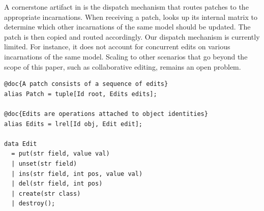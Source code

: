 A cornerstone artifact in \prism is the dispatch mechanism that routes patches to the appropriate incarnations.
When receiving a patch, \prism looks up its internal matrix to determine which other incarnations of the same model should be updated.
The patch is then copied and routed accordingly.
Our dispatch mechanism is currently limited.
For instance, it does not account for concurrent edits on various incarnations of the same model.
Scaling \prism to other scenarios that go beyond the scope of this paper, such as collaborative editing, remains an open problem.


\begin{lstlisting}[label=lst:delta-adt, caption={CRUD-like patch definition in Rascal.}, language=Rascal, float=tb]
@doc{A patch consists of a sequence of edits}
alias Patch = tuple[Id root, Edits edits];

@doc{Edits are operations attached to object identities}
alias Edits = lrel[Id obj, Edit edit];

data Edit
  = put(str field, value val)
  | unset(str field)
  | ins(str field, int pos, value val)
  | del(str field, int pos)
  | create(str class) 
  | destroy();
\end{lstlisting}
